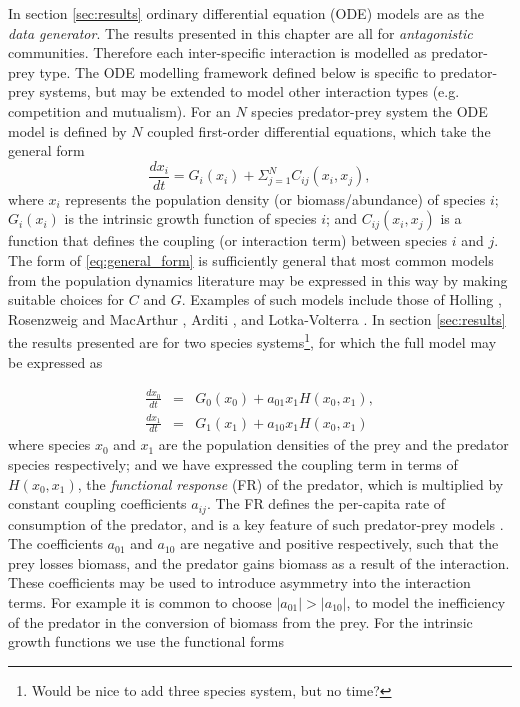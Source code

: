 In section \ref{sec:results} ordinary differential equation (ODE) models are as the \emph{data generator}. The results presented in this chapter are all for \emph{antagonistic} communities. Therefore each inter-specific interaction is modelled as predator-prey type. The ODE modelling framework defined below is specific to predator-prey systems, but may be extended  to model other interaction types (e.g. competition and mutualism). For an $N$ species predator-prey system the ODE model is defined by $N$ coupled first-order differential equations, which take the general form
\begin{equation}
\frac{dx_i}{dt} = G_i(x_i) + \Sigma_{j=1}^N C_{ij}(x_i,x_j),
\label{eq:general_form}
\end{equation}
%
where $x_i$ represents the population density (or biomass/abundance) of species $i$; $G_i(x_i)$ is the intrinsic growth function of species $i$; and $C_{ij}(x_i,x_j)$ is a function that defines the coupling (or interaction term) between species $i$ and $j$. The form of \eqref{eq:general_form} is sufficiently general that most common models from the population dynamics literature may be expressed in this way by making suitable choices for $C$ and $G$. Examples of such models include those of Holling \cite{holling1959some}, Rosenzweig and MacArthur \cite{rosenzweig1963graphical}, Arditi \cite{arditi2012species}, and Lotka-Volterra \cite{volterra1926,lotka1925elements}. In section \ref{sec:results} the results presented are for two species systems\footnote{Would be nice to add three species system, but no time?}, for which the full model may be expressed as

\begin{eqnarray}
\frac{dx_0}{dt} &=& G_{0}(x_0) + a_{01}x_1H(x_0,x_1),  \nonumber \\[10pt]
\frac{dx_1}{dt} &=& G_{1}(x_1) + a_{10}x_1H(x_0,x_1)
\label{eq:two_species}
\end{eqnarray}
%
where species $x_0$ and $x_1$ are the population densities of the prey and the predator species respectively; and we have expressed the coupling term in terms of $H(x_0,x_1)$, the \emph{functional response} (FR) of the predator, which is multiplied by constant coupling coefficients $a_{ij}$. The FR defines the per-capita rate of consumption of the predator, and is a key feature of such predator-prey models \cite{barraquand2014functional,jost2000identifying}. The coefficients $a_{01}$ and $a_{10}$ are negative and positive respectively, such that the prey losses biomass, and the predator gains biomass as a result of the interaction. These coefficients may be used to introduce asymmetry into the interaction terms. For example it is common to choose $|a_{01}| > |a_{10}|$, to model the inefficiency of the predator in the conversion of biomass from the prey. For the intrinsic growth functions we use the functional forms  

